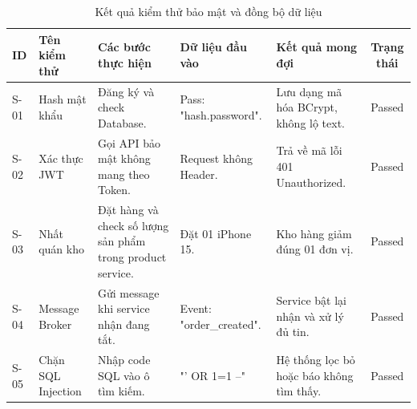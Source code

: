 \begin{table}[H]
\centering
\caption{Kết quả kiểm thử bảo mật và đồng bộ dữ liệu}
\label{tab:security}
\small
\begin{tabularx}{\textwidth}{|l|X|X|X|X|c|}
\hline
\textbf{ID} & \textbf{Tên kiểm thử} & \textbf{Các bước thực hiện} & \textbf{Dữ liệu đầu vào} & \textbf{Kết quả mong đợi} & \textbf{Trạng thái} \\ \hline
S-01 & Hash mật khẩu & Đăng ký và check Database. & Pass: "hash.password". & Lưu dạng mã hóa BCrypt, không lộ text. & Passed \\ \hline
S-02 & Xác thực JWT & Gọi API bảo mật không mang theo Token. & Request không Header. & Trả về mã lỗi 401 Unauthorized. & Passed \\ \hline
S-03 & Nhất quán kho & Đặt hàng và check số lượng sản phẩm trong product service. & Đặt 01 iPhone 15. & Kho hàng giảm đúng 01 đơn vị. & Passed \\ \hline
S-04 & Message Broker & Gửi message khi service nhận đang tắt. & Event: "order\_created". & Service bật lại nhận và xử lý đủ tin. & Passed \\ \hline
S-05 & Chặn SQL Injection & Nhập code SQL vào ô tìm kiếm. & "' OR 1=1 --" & Hệ thống lọc bỏ hoặc báo không tìm thấy. & Passed \\ \hline
\end{tabularx}
\end{table}